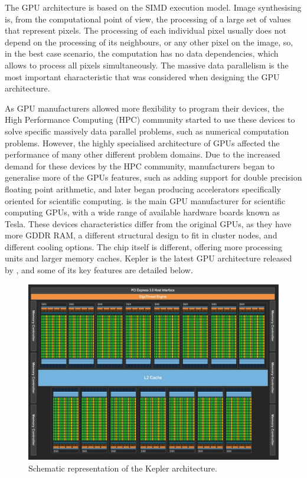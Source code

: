 The GPU architecture is based on the SIMD execution model. Image synthesising is, from the computational point of view, the processing of a large set of values that represent pixels. The processing of each individual pixel usually does not depend on the processing of its neighbours, or any other pixel on the image, so, in the best case scenario, the computation has no data dependencies, which allows to process all pixels simultaneously. The massive data parallelism is the most important characteristic that was considered when designing the GPU architecture.

As GPU manufacturers allowed more flexibility to program their devices, the High Performance Computing (HPC) community started to use these devices to solve specific massively data parallel problems, such as numerical computation problems. However, the highly specialised architecture of GPUs affected the performance of many other different problem domains. Due to the increased demand for these devices by the HPC community, manufacturers began to generalise more of the GPUs features, such as adding support for double precision floating point arithmetic, and later began producing accelerators specifically oriented for scientific computing. \nvidia is the main GPU manufacturer for scientific computing GPUs, with a wide range of available hardware boards known as Tesla. These devices characteristics differ from the original GPUs, as they have more GDDR RAM, a different structural design to fit in cluster nodes, and different cooling options. The chip itself is different, offering more processing units and larger memory caches. Kepler \cite{NVIDIA:Kepler} is the latest GPU architecture released by \nvidia, and some of its key features are detailed below.

\begin{figure}[!htp]
	\begin{center}
		\includegraphics[scale=0.45]{imgs/kepler_arch.png}
		\caption{Schematic representation of the \nvidia Kepler architecture.}
		\label{fig:kepler}
	\end{center}
\end{figure}

